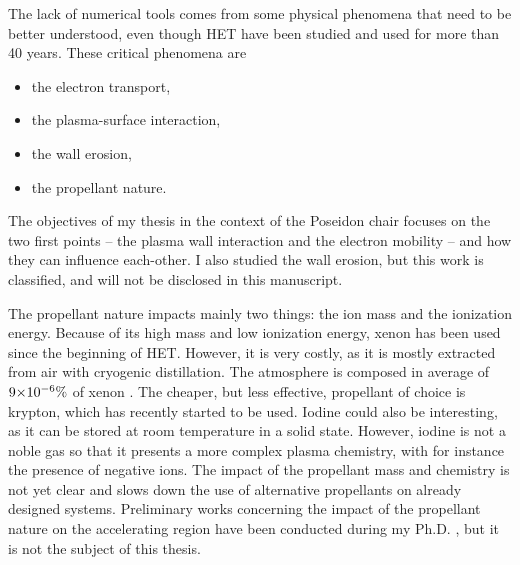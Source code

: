 The lack of numerical tools comes from some physical phenomena that need to be better understood, even though \ac{HET} have been studied and used for more than 40 years.
These critical phenomena are \citep{samukawa2012,adamovich2017}
\begin{itemize}
  \item the electron transport,
  \item the plasma-surface interaction,
  \item the wall erosion,
  \item the propellant nature.
\end{itemize}


\vspace{1em}
The objectives of my thesis in the context of the {\sc Poseidon} chair focuses on the two first points -- the plasma wall interaction and the electron mobility -- and how they can influence each-other.
I also studied the wall erosion, but this work is classified, and will not be disclosed in this manuscript.

The propellant nature impacts mainly two things\string: the ion mass and the ionization energy.
Because of its high mass and low ionization energy, xenon has been used since the beginning of \ac{HET}. 
However, it is very costly, as it is mostly extracted from air with cryogenic distillation.
The atmosphere is composed in average of ${{9}{\times}10^{-6}}\%$ of xenon \citep{earthfacs}.
The cheaper, but less effective, propellant of choice is krypton, which has recently started to be used.
Iodine could also be interesting, as it can be stored at room temperature in a solid state.
However, iodine is not a noble gas so that it presents a more complex plasma chemistry, with for instance the presence of negative ions.
The impact of the propellant mass and chemistry is not yet clear and slows down the use of alternative propellants on already designed systems.
Preliminary works concerning the impact of the propellant nature on the accelerating region have been conducted during my Ph.D. \citep{croes2018}, but it is not the subject of this thesis.



